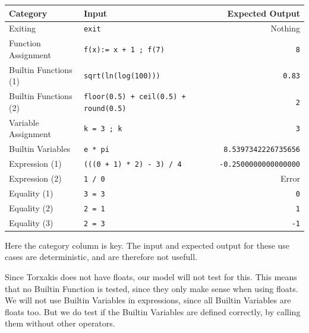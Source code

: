 \documentclass[11pt,a4paper]{article}
\begin{document}
\begin{center}
	\begin{tabular}{llr}
		Category & Input & Expected Output\\
		\hline
		Exiting & \texttt{exit} & Nothing\\
		Function Assignment & \texttt{f(x):= x + 1 ; f(7)} & \texttt{8}\\
		Builtin Functions (1) & \texttt{sqrt(ln(log(100)))} & \texttt{0.83}\\
		Builtin Functions (2) & \texttt{floor(0.5) + ceil(0.5) + round(0.5)} & \texttt{2}\\
		Variable Assignment & \texttt{k = 3 ; k} & \texttt{3}\\
		Builtin Variables & \texttt{e * pi} & \texttt{8.5397342226735656}\\
		Expression (1) & \texttt{(((0 + 1) * 2) - 3) / 4} & \texttt{-0.2500000000000000}\\
		Expression (2) & \texttt{1 / 0} & Error\\
		Equality (1) & \texttt{3 = 3} & \texttt{0}\\
		Equality (2) & \texttt{2 = 1} & \texttt{1}\\
		Equality (3) & \texttt{2 = 3} & \texttt{-1}\\
	\end{tabular}
\end{center}

Here the category column is key. The input and expected output for these use cases are deterministic, and are therefore not usefull.

Since Torxakis does not have floats, our model will not test for this. This means that no Builtin Function is tested, since they only make sense when using floats. We will not use Builtin Variables in expressions, since all Builtin Variables are floats too. But we do test if the Builtin Variables are defined correctly, by calling them without other operators.



\end{document}
